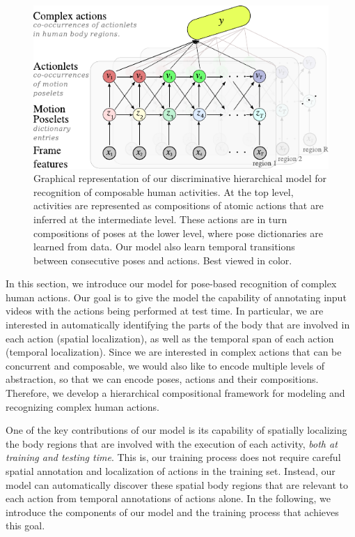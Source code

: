\begin{figure}[tb]
\begin{center}
\includegraphics[width=0.99\linewidth]{./Fig/modelo.pdf}
\end{center}
   \caption{Graphical representation of our discriminative hierarchical model for recognition of composable human activities.
At the top level, activities are represented as compositions of atomic actions that are inferred at
the intermediate level. These actions are in turn compositions of poses at the
lower level, where pose dictionaries are learned from data. Our model also learn
temporal transitions between consecutive poses and actions. Best viewed in
color.}
\label{fig:overview}

\end{figure}


In this section, we introduce our model for pose-based recognition of complex
human actions. Our goal is to give the model the capability of annotating input
videos with the actions being performed at test time. In particular, we are
interested in automatically identifying the parts of the body that are involved
in each action (spatial localization), as well as the temporal span of each
action (temporal localization). Since we are interested in complex actions that
can be concurrent and composable,
we would also like to encode multiple levels of
abstraction, so that we can encode poses, actions and their compositions.
Therefore, we develop a hierarchical compositional framework for modeling and
recognizing complex human actions.

One of the key contributions of our model is its capability of spatially
localizing the body regions that are involved with the execution of each
activity, \emph{both at training and testing time}. This is, our training
process does not require careful spatial annotation and localization of
actions in the training set. Instead, our model can automatically
discover these spatial body regions that are relevant to each action
from temporal annotations of actions alone. In the following, we introduce
the components of our model and the training process that achieves this goal.

